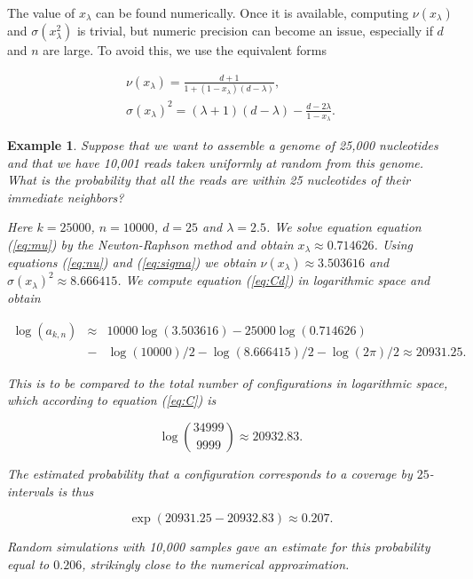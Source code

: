 \documentclass{article}
\newtheorem{example}{Example}
\begin{document}
The value of $x_\lambda$ can be found numerically. Once it is available,
computing $\nu(x_\lambda)$ and $\sigma(x_\lambda^2)$ is trivial, but
numeric precision can become an issue, especially if $d$ and $n$ are
large. To avoid this, we use the equivalent forms

\begin{gather}
\nu(x_\lambda) = \frac{d+1}{1 +
  (1-x_\lambda)(d-\lambda)}, \label{eq:nu} \\
\sigma(x_\lambda)^2 = (\lambda+1)(d-\lambda) -
  \frac{d-2\lambda}{1-x_\lambda}. \label{eq:sigma}
\end{gather}


\begin{example}

Suppose that we want to assemble a genome of 25,000 nucleotides and that
we have 10,001 reads taken uniformly at random from this genome. What is
the probability that all the reads are within 25 nucleotides of their
immediate neighbors?

Here $k=25000$, $n=10000$, $d=25$ and $\lambda = 2.5$. We solve equation
equation (\ref{eq:mu}) by the Newton-Raphson method and obtain $x_\lambda
\approx 0.714626$. Using equations (\ref{eq:nu}) and (\ref{eq:sigma}) we
obtain $\nu(x_\lambda) \approx 3.503616$ and $\sigma(x_\lambda)^2 \approx
8.666415$. We compute equation (\ref{eq:Cd}) in logarithmic space and
obtain

\begin{eqnarray*}
\log(a_{k,n}) &\approx& 10000 \log(3.503616) - 25000 \log(0.714626) \\
&-& \log(10000)/2 - \log(8.666415)/2 - \log(2\pi)/2
\approx 20931.25.
\end{eqnarray*}

This is to be compared to the total number of configurations in
logarithmic space, which according to equation (\ref{eq:C}) is

\begin{equation*}
\log { 34999 \choose 9999 } \approx 20932.83.
\end{equation*}

The estimated probability that a configuration corresponds to a coverage
by $25$-intervals is
thus

\begin{equation*}
\exp(20931.25-20932.83) \approx 0.207.
\end{equation*}

Random simulations with 10,000 samples gave an estimate for this
probability equal to $0.206$, strikingly close to the numerical
approximation.

\end{example}
\end{document}
